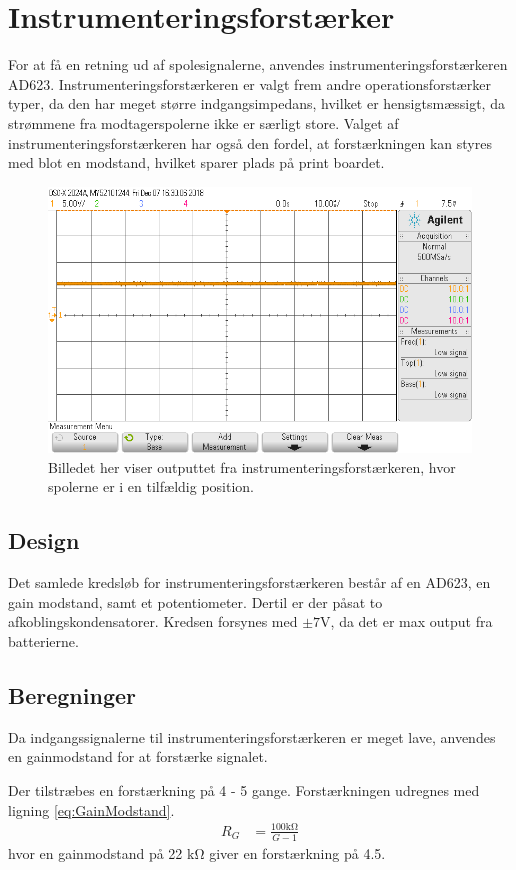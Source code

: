 \section{Instrumenteringsforstærker}\label{sec:summa}
For at få en retning ud af spolesignalerne, anvendes instrumenteringsforstærkeren AD623. Instrumenteringsforstærkeren er valgt frem andre operationsforstærker typer, da den har meget større indgangsimpedans, hvilket er hensigtsmæssigt, da strømmene fra modtagerspolerne ikke er særligt store. Valget af instrumenteringsforstærkeren har også den fordel, at forstærkningen kan styres med blot en modstand, hvilket sparer plads på print boardet.

\begin{figure}[h!]
	\centering
	\includegraphics[width=1\textwidth]{billeder/instr_png.png}
	\caption{Billedet her viser outputtet fra instrumenteringsforstærkeren, hvor spolerne er i en tilfældig position.}
	\label{fig:filter_out}
\end{figure}

\subsection{Design}
Det samlede kredsløb for instrumenteringsforstærkeren består af en AD623, en gain modstand, samt et potentiometer. Dertil er der påsat to afkoblingskondensatorer. Kredsen forsynes med $\pm 7 \si{\volt}$, da det er max output fra batterierne. 


\subsection{Beregninger}
Da indgangssignalerne til instrumenteringsforstærkeren er meget lave, anvendes en gainmodstand for at forstærke signalet.

Der tilstræbes en forstærkning på 4 - 5 gange. Forstærkningen udregnes med ligning \ref{eq:GainModstand}.
\begin{align}
	R_G & = \frac{100 \si{\kilo\ohm}}{G-1} \label{eq:GainModstand}
\end{align}
hvor en gainmodstand på 22 \si{\kilo\ohm} giver en forstærkning på 4.5.